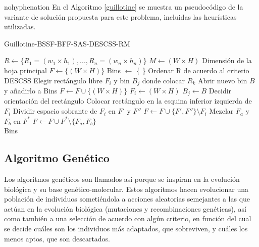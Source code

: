 \documentclass[a4paper,10pt,twocolumn]{article}
\begin{document}
\begin{hyphenrules}{nohyphenation}
En el Algoritmo \ref{guillotine} se muestra un pseudocódigo de la variante de solución propuesta para este problema, incluidas las heurísticas utilizadas. 

 
\algrenewcommand{}
\begin{algorithm}
\caption{Guillotine-BSSF-BFF-SAS-DESCSS-RM}\label{guillotine}
\begin{algorithmic}[1]
	\Require $R \gets \{ R_1 = (w_1 \times h_1), ..., R_n = (w_n \times h_n) \}$ $ M \gets (W \times H)$ \Comment Dimensión de la hoja principal
	\State $F \gets \{(W \times H)\}$
	\State Bins $\gets $ \{ \}
	\State Ordenar R de acuerdo al criterio DESCSS
		\State Elegir rectángulo libre $F_i$ y bin $B_j$ donde colocar $R_k$
			\State Abrir nuevo bin $B$ y a\~nadirlo a Bins
			\State $F \gets F \cup \{(W \times H)\}$
			\State $F_i \gets (W \times H)$
			\State $B_j \gets B$ 
		\EndIf
		\State Decidir orientación del rectángulo
		\State Colocar rectángulo en la esquina inferior izquierda de $F_i$
		\State Dividir espacio sobrante de $F_i$ en $F'$ y $F''$
		\State $F \gets F \cup \{F', F''\} \setminus F_i $
			\State Mezclar $F_a$ y $F_b$ en $F^*$
			\State $F \gets F \cup F^* \setminus \{F_a, F_b\}  $
		\EndWhile
	\EndFor\\
	\Return  Bins
\end{algorithmic}
\end{algorithm}


\subsection{Algoritmo Genético}

Los algoritmos genéticos son llamados así porque se inspiran en la evolución biológica y su base genético-molecular. Estos algoritmos hacen evolucionar una población de individuos sometiéndola a acciones aleatorias semejantes a las que actúan en la evolución biológica (mutaciones y recombinaciones genéticas), así como también a una selección de acuerdo con algún criterio, en función del cual se decide cuáles son los individuos más adaptados, que sobreviven, y cuáles los menos aptos, que son descartados.\cite{5}


\end{hyphenrules}
\end{document}
